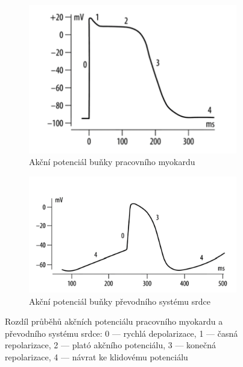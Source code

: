 \begin{figure}[h]
	\centering
	\begin{subfigure}{0.4\textwidth}
		\includegraphics[width=1\textwidth]{../assets/anatomy/myokard_ap}
		\caption{Akční potenciál buňky pracovního myokardu \cite{Petrek2019}}
		\label{fig:myokard_ap}
	\end{subfigure}
	\hfil
	\begin{subfigure}{0.5\textwidth}
		\includegraphics[width=1\textwidth]{../assets/anatomy/pss_ap}
		\caption{Akční potenciál buňky převodního systému srdce
			\cite{Petrek2019}}
		\label{fig:pss_ap}
	\end{subfigure}
	\caption{Rozdíl průběhů akčních potenciálu pracovního myokardu a převodního
		systému srdce: 0 --- rychlá depolarizace, 1 --- časná repolarizace, 2
		--- plató akčního potenciálu, 3 --- konečná repolarizace, 4 --- návrat
		ke klidovému potenciálu}
	\label{fig:ap}
\end{figure}

